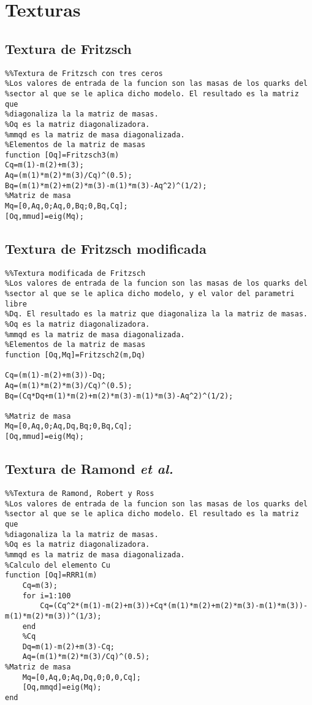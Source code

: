 \section{Texturas}
\subsection{Textura de Fritzsch}
\begin{verbatim}
%%Textura de Fritzsch con tres ceros
%Los valores de entrada de la funcion son las masas de los quarks del
%sector al que se le aplica dicho modelo. El resultado es la matriz que
%diagonaliza la la matriz de masas.
%Oq es la matriz diagonalizadora.
%mmqd es la matriz de masa diagonalizada.
%Elementos de la matriz de masas
function [Oq]=Fritzsch3(m)
Cq=m(1)-m(2)+m(3);
Aq=(m(1)*m(2)*m(3)/Cq)^(0.5);
Bq=(m(1)*m(2)+m(2)*m(3)-m(1)*m(3)-Aq^2)^(1/2);
%Matriz de masa
Mq=[0,Aq,0;Aq,0,Bq;0,Bq,Cq];
[Oq,mmud]=eig(Mq);
\end{verbatim}

\subsection{Textura de Fritzsch modificada}
\begin{verbatim}
%%Textura modificada de Fritzsch
%Los valores de entrada de la funcion son las masas de los quarks del
%sector al que se le aplica dicho modelo, y el valor del parametri libre 
%Dq. El resultado es la matriz que diagonaliza la la matriz de masas.
%Oq es la matriz diagonalizadora.
%mmqd es la matriz de masa diagonalizada.
%Elementos de la matriz de masas
function [Oq,Mq]=Fritzsch2(m,Dq)

Cq=(m(1)-m(2)+m(3))-Dq;
Aq=(m(1)*m(2)*m(3)/Cq)^(0.5);
Bq=(Cq*Dq+m(1)*m(2)+m(2)*m(3)-m(1)*m(3)-Aq^2)^(1/2);

%Matriz de masa
Mq=[0,Aq,0;Aq,Dq,Bq;0,Bq,Cq];
[Oq,mmud]=eig(Mq);
\end{verbatim}

\subsection{Textura de Ramond {\it et al.}}
\begin{verbatim}
%%Textura de Ramond, Robert y Ross
%Los valores de entrada de la funcion son las masas de los quarks del
%sector al que se le aplica dicho modelo. El resultado es la matriz que
%diagonaliza la la matriz de masas.
%Oq es la matriz diagonalizadora.
%mmqd es la matriz de masa diagonalizada.
%Calculo del elemento Cu
function [Oq]=RRR1(m)
    Cq=m(3);
    for i=1:100
        Cq=(Cq^2*(m(1)-m(2)+m(3))+Cq*(m(1)*m(2)+m(2)*m(3)-m(1)*m(3))-
m(1)*m(2)*m(3))^(1/3);
    end
    %Cq
    Dq=m(1)-m(2)+m(3)-Cq;
    Aq=(m(1)*m(2)*m(3)/Cq)^(0.5);
%Matriz de masa
    Mq=[0,Aq,0;Aq,Dq,0;0,0,Cq];
    [Oq,mmqd]=eig(Mq);
end
\end{verbatim}
